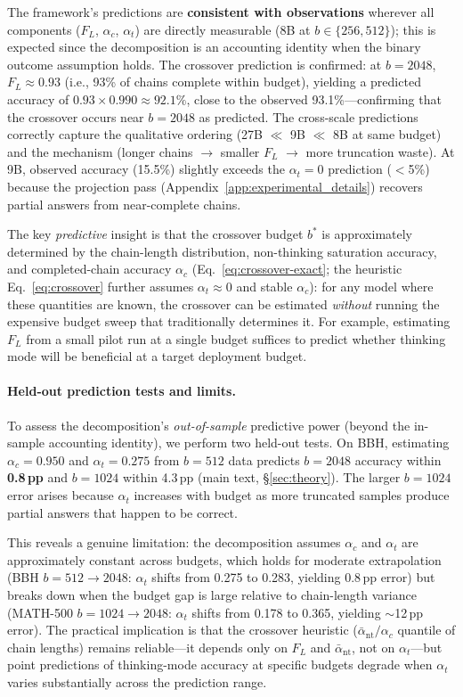 The framework's predictions are \textbf{consistent with observations} wherever all components ($F_L$, $\alpha_c$, $\alpha_t$)
are directly measurable (8B at $b{\in}\{256, 512\}$); this is expected since the decomposition is an accounting identity when the binary outcome assumption holds.
The crossover prediction is confirmed: at $b{=}2048$,
$F_L \approx 0.93$ (i.e., 93\% of chains complete within budget), yielding a predicted accuracy of
$0.93 \times 0.990 \approx 92.1\%$, close to the observed 93.1\%---confirming that the crossover occurs near $b{=}2048$ as predicted.
The cross-scale predictions correctly capture the qualitative ordering
(27B $\ll$ 9B $\ll$ 8B at same budget) and the mechanism (longer chains $\rightarrow$ smaller $F_L$
$\rightarrow$ more truncation waste).
At 9B, observed accuracy (15.5\%) slightly exceeds the $\alpha_t{=}0$ prediction ($<$5\%) because
the projection pass (Appendix~\ref{app:experimental_details}) recovers partial answers
from near-complete chains.

The key \emph{predictive} insight is that the crossover budget $b^*$ is
approximately determined by the chain-length distribution, non-thinking
saturation accuracy, and completed-chain accuracy $\alpha_c$
(Eq.~\ref{eq:crossover-exact}; the heuristic Eq.~\ref{eq:crossover}
further assumes $\alpha_t \approx 0$ and stable $\alpha_c$):
for any model where these quantities are known, the crossover can be estimated
\emph{without} running the expensive budget sweep that traditionally determines it.
For example, estimating $F_L$ from a small pilot run at a single budget suffices
to predict whether thinking mode will be beneficial at a target deployment budget.

\paragraph{Held-out prediction tests and limits.}
To assess the decomposition's \emph{out-of-sample} predictive power (beyond the in-sample accounting identity),
we perform two held-out tests.
On BBH, estimating $\alpha_c{=}0.950$ and $\alpha_t{=}0.275$ from $b{=}512$ data
predicts $b{=}2048$ accuracy within \textbf{0.8\,pp} and $b{=}1024$ within 4.3\,pp
(main text, \S\ref{sec:theory}).
The larger $b{=}1024$ error arises because $\alpha_t$ increases with budget as more truncated
samples produce partial answers that happen to be correct.

This reveals a genuine limitation: the decomposition assumes $\alpha_c$ and $\alpha_t$ are
approximately constant across budgets, which holds for moderate extrapolation
(BBH $b{=}512{\to}2048$: $\alpha_t$ shifts from 0.275 to 0.283, yielding 0.8\,pp error)
but breaks down when the budget gap is large relative to chain-length variance
(MATH-500 $b{=}1024{\to}2048$: $\alpha_t$ shifts from 0.178 to 0.365, yielding ${\sim}$12\,pp error).
The practical implication is that the crossover heuristic ($\bar{\alpha}_{\mathrm{nt}}/\alpha_c$ quantile of chain lengths)
remains reliable---it depends only on $F_L$ and $\bar{\alpha}_{\mathrm{nt}}$, not on $\alpha_t$---but
point predictions of thinking-mode accuracy at specific budgets degrade when $\alpha_t$
varies substantially across the prediction range.

